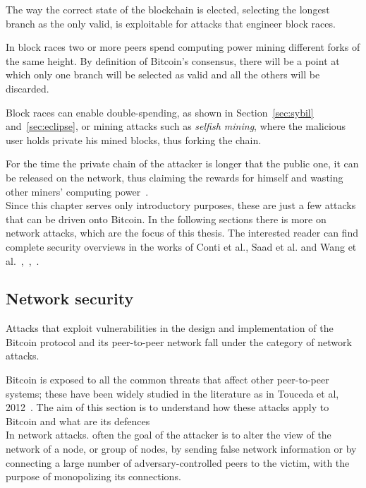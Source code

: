 \documentclass[12pt, letterpaper, twoside]{article}
\begin{document}
The way the correct state of the blockchain is elected, selecting the longest branch as the only valid, is exploitable for attacks that engineer block races.

In block races two or more peers spend computing power mining different forks of the same height. By definition of Bitcoin's consensus, there will be a point at which only one branch will be selected as valid and all the others will be discarded.

Block races can enable double-spending, as shown in Section~\ref{sec:sybil} and~\ref{sec:eclipse}, or mining attacks such as \textit{selfish mining}, where the malicious user holds private his mined blocks, thus forking the chain.

For the time the private chain of the attacker is longer that the public one, it can be released on the network, thus claiming the rewards for himself and wasting other miners' computing power~\cite{selfishmining}.\\

Since this chapter serves only introductory purposes, these are just a few attacks that can be driven onto Bitcoin. In the following sections there is more on network attacks, which are the focus of this thesis. The interested reader can find complete security overviews in the works of Conti et al., Saad et al. and Wang et al.~\cite{contiatksurvey},~\cite{saad2019attacksurface},~\cite{secpermissionlessblock}.

\subsection{Network security}\label{sec:netsec}
Attacks that exploit vulnerabilities in the design and implementation of the Bitcoin protocol and its peer-to-peer network fall under the category of network attacks.

Bitcoin is exposed to all the common threats that affect other peer-to-peer systems; these have been widely studied in the literature as in Touceda et al, 2012~\cite{toucedafakeboot}. The aim of this section is to understand how these attacks apply to Bitcoin and what are its defences\\

In network attacks. often the goal of the attacker is to alter the view of the network of a node, or group of nodes, by sending false network information or by connecting a large number of adversary-controlled peers to the victim, with the purpose of monopolizing its connections.
\end{document}

